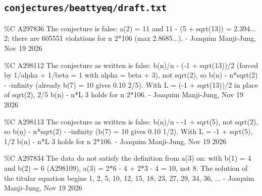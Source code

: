 \subsection*{\texttt{conjectures/beattyeq/draft.txt}}
{\small\raggedright\ttfamily
\%C A297836 The conjecture is false: a(2) = 11 and 11 - (5 + sqrt(13)) = 2.394...  2; there are 605551 violations for n  2*106 (max 2.8685...). - Joaquim Manji-Jung, Nov 19 2026\par
\%C A298112 The conjecture as written is false: b(n)/n - (-1 + sqrt(13))/2 (forced by 1/alpha + 1/beta = 1 with alpha = beta + 3), not sqrt(2), so b(n) - n*sqrt(2) - -infinity (already b(7) = 10 gives 0.10  2/5). With L = (-1 + sqrt(13))/2 in place of sqrt(2), 2/5  b(n) - n*L  3 holds for n  2*106. - Joaquim Manji-Jung, Nov 19 2026\par
\%C A298113 The conjecture as written is false: b(n)/n - -1 + sqrt(5), not sqrt(2), so b(n) - n*sqrt(2) - -infinity (b(7) = 10 gives 0.10  1/2). With L = -1 + sqrt(5), 1/2  b(n) - n*L  3 holds for n  2*106. - Joaquim Manji-Jung, Nov 19 2026\par
\%C A297834 The data do not satisfy the definition from a(3) on: with b(1) = 4 and b(2) = 6 (A298109), a(3) = 2*6 - 4 + 2*3 - 4 = 10, not 8. The solution of the titular equation begins 1, 2, 5, 10, 12, 15, 18, 23, 27, 29, 34, 36, ... - Joaquim Manji-Jung, Nov 19 2026\par
}
